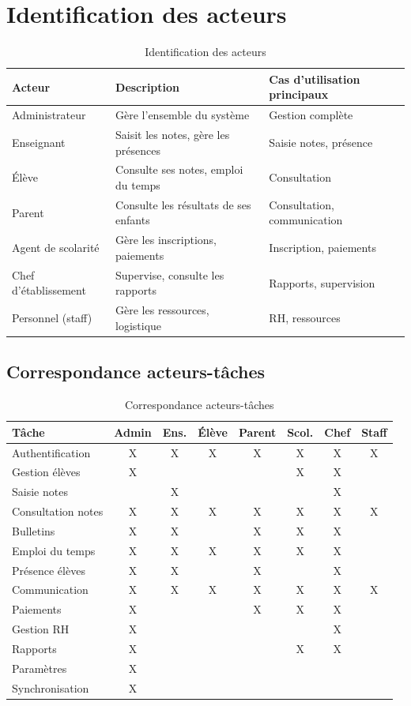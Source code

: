 \documentclass[12pt,a4paper,twoside]{report}
\begin{document}
\section{Identification des acteurs}

\begin{table}[h]
\centering
\caption{Identification des acteurs}
\begin{tabular}{lp{5cm}p{5cm}}
\toprule
Acteur & Description & Cas d'utilisation principaux \\
\midrule
Administrateur & Gère l'ensemble du système & Gestion complète \\
Enseignant & Saisit les notes, gère les présences & Saisie notes, présence \\
Élève & Consulte ses notes, emploi du temps & Consultation \\
Parent & Consulte les résultats de ses enfants & Consultation, communication \\
Agent de scolarité & Gère les inscriptions, paiements & Inscription, paiements \\
Chef d'établissement & Supervise, consulte les rapports & Rapports, supervision \\
Personnel (staff) & Gère les ressources, logistique & RH, ressources \\
\bottomrule
\end{tabular}
\end{table}

\subsection{Correspondance acteurs-tâches}

\begin{table}[h]
\centering
\caption{Correspondance acteurs-tâches}
\footnotesize
\begin{tabular}{lccccccc}
\toprule
Tâche & Admin & Ens. & Élève & Parent & Scol. & Chef & Staff \\
\midrule
Authentification & X & X & X & X & X & X & X \\
Gestion élèves & X &  &  &  & X & X &  \\
Saisie notes &  & X &  &  &  & X &  \\
Consultation notes & X & X & X & X & X & X & X \\
Bulletins & X & X &  & X & X & X &  \\
Emploi du temps & X & X & X & X & X & X &  \\
Présence élèves & X & X &  & X &  & X &  \\
Communication & X & X & X & X & X & X & X \\
Paiements & X &  &  & X & X & X &  \\
Gestion RH & X &  &  &  &  & X &  \\
Rapports & X &  &  &  & X & X &  \\
Paramètres & X &  &  &  &  &  &  \\
Synchronisation & X &  &  &  &  &  &  \\
\bottomrule
\end{tabular}
\end{table}
\end{document}
